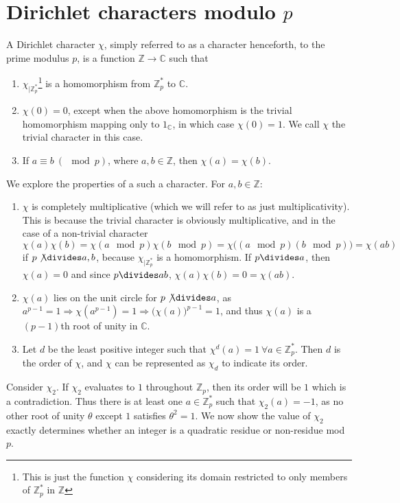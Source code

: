 \documentclass{report}
\begin{document}
\section{Dirichlet characters modulo $p$}
%
A Dirichlet character $\chi$, simply referred to as a character henceforth, to the prime modulus $p$, is a function $\mathbb{Z} \rightarrow \mathbb{C}$ such that
\begin{enumerate}
    \item $\chi_{|\mathbb{Z}^*_p}$\footnote[2]{This is just the function $\chi$ considering its domain restricted to only members of $\mathbb{Z}^*_p$ in $\mathbb{Z}$} is a homomorphism from $\mathbb{Z}^*_p$ to $\mathbb{C}$.
    \item $\chi(0)=0$, except when the above homomorphism is the trivial homomorphism mapping only to $1_{\mathbb {C}}$, in which case $\chi(0)=1$. We call $\chi$ the trivial character in this case.
    \item If $a \equiv b\  (\!\mod p)$, where $a,b\in\mathbb{Z}$, then $\chi(a)=\chi(b)$.
\end{enumerate}
We explore the properties of a such a character. For $a,b \in \mathbb{Z}$:
\begin{enumerate}
    \item $\chi$ is completely multiplicative (which we will refer to as just multiplicativity). This is because the trivial character is obviously multiplicative, and in the case of a non-trivial character $\chi(a)\chi(b)=\chi(a \mod p)\chi(b \mod p)= \chi\big((a \mod p)(b \mod p)\big)=\chi(ab)$ if $p\not\divides a,b$, because $\chi_{|\mathbb{Z}^*_p}$ is a homomorphism. If $p\divides a$, then $\chi(a)=0$ and since $p\divides ab$, $\chi(a)\chi(b)=0=\chi(ab)$.
    \item $\chi(a)$ lies on the unit circle for $p\not\divides a$, as $a^{p-1}=1 \Rightarrow \chi(a^{p-1})=1 \Rightarrow \big( \chi(a) \big)^{p-1} = 1$, and thus $\chi(a)$ is a $(p-1)$th root of unity in $\mathbb{C}$.
    \item Let $d$ be the least positive integer such that $\chi^d(a)=1 \ \forall a\in \mathbb{Z}^*_p$. Then $d$ is the order of $\chi$, and $\chi$ can be represented as $\chi_d$ to indicate its order.
\end{enumerate}

Consider $\chi_2$. If $\chi_2$ evaluates to $1$ throughout $\mathbb{Z}_p$, then its order will be $1$ which is a contradiction. Thus there is at least one $a\in\mathbb{Z}^*_p$ such that $\chi_2(a)=-1$, as no other root of unity $\theta$ except $1$ satisfies $\theta^2=1$. We now show the value of $\chi_2$ exactly determines whether an integer is a quadratic residue or non-residue mod $p$.
\end{document}
